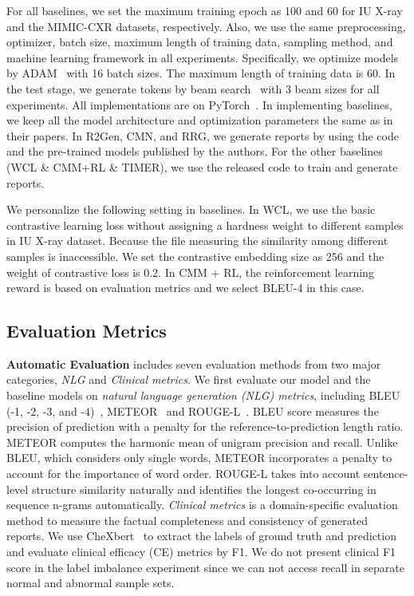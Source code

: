 \documentclass[sn-mathphys-num]{sn-jnl}%
\theoremstyle{thmstyleone}%
\theoremstyle{thmstyletwo}%
\theoremstyle{thmstylethree}%
\begin{document}
\begin{appendices}
For all baselines, we set the maximum training epoch as 100 and 60 for IU X-ray and the MIMIC-CXR datasets, respectively.
Also, we use the same preprocessing, optimizer, batch size, maximum length of training data, sampling method, and machine learning framework in all experiments. Specifically, we optimize models by ADAM~\cite{kingma2014adam} with 16 batch sizes. The maximum length of training data is 60. In the test stage, we generate tokens by beam search~\cite{sutskever2014advances} with 3 beam sizes for all experiments. All implementations are on PyTorch~\cite{adam2019pytorch}.  In implementing baselines, we keep all the model architecture and optimization parameters the same as in their papers. In R2Gen, CMN, and RRG, we generate reports by using the code and the pre-trained models published by the authors. For the other baselines (WCL \& CMM+RL \& TIMER), we use the released code to train and generate reports.

We personalize the following setting in baselines.
In WCL, we use the basic contrastive learning loss without assigning a hardness weight to different samples in IU X-ray dataset. Because the file measuring the similarity among different samples is inaccessible.
We set the contrastive embedding size as 256 and the weight of contrastive loss is 0.2. In CMM + RL, the reinforcement learning reward is based on evaluation metrics and we select BLEU-4 in this case.

\subsection{Evaluation Metrics}
\textbf{Automatic Evaluation} includes seven evaluation methods from two major categories, \textit{NLG} and \textit{Clinical metrics}. We first evaluate our model and the baseline models on \textit{natural language generation (NLG) metrics}, including BLEU (-1, -2, -3, and -4)~\cite{papineni2002bleu}, METEOR~\cite{denkowski2011meteor} and ROUGE-L~\cite{lin2004rouge}.
BLEU score measures the precision of prediction with a penalty for the reference-to-prediction length ratio. METEOR computes the harmonic mean of unigram precision and recall. 
Unlike BLEU, which considers only single words, METEOR incorporates a penalty to account for the importance of word order.
ROUGE-L takes into account sentence-level structure similarity naturally and identifies the longest co-occurring in sequence n-grams automatically. \textit{Clinical metrics} is a domain-specific evaluation method to measure the factual completeness and consistency of generated reports. 
We use CheXbert~\cite{smit2020combining} to extract the labels of ground truth and prediction and evaluate clinical efficacy (CE) metrics by F1. 
We do not present clinical F1 score in the label imbalance experiment since we can not access recall in separate normal and abnormal sample sets.


\end{appendices}
\end{document}
